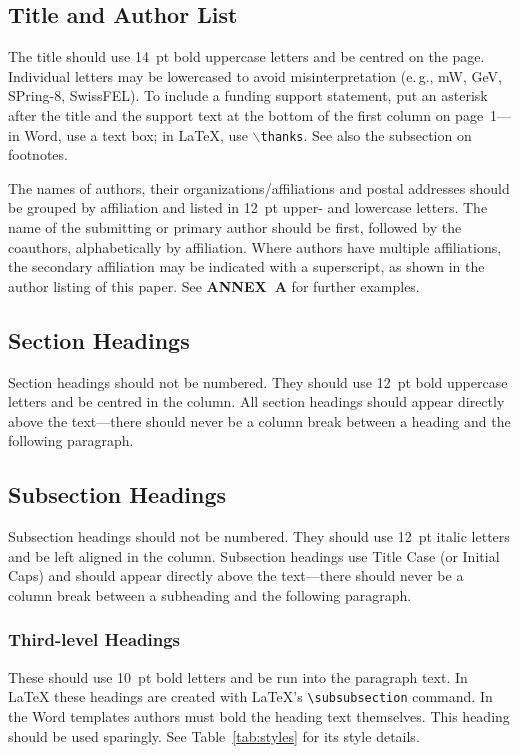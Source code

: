 \documentclass[a4paper,
               keeplastbox,   %
               ]{jacow}
\begin{document}
\subsection{Title and Author List}

The title should use \SI{14}{pt} bold uppercase letters and be centred on the page.
Individual letters may be lowercased to avoid misinterpretation (e.\,g., mW, GeV, 
SPring-8, SwissFEL).
To include a funding support statement, put an asterisk after the title and
the support text at the bottom of the first column on page~1---in Word,
use a text box; in \LaTeX, use $\backslash$\texttt{thanks}. See also the
subsection on footnotes.

The names of authors, their organizations/affiliations and
postal addresses should be grouped by affiliation and
listed in \SI{12}{pt} upper- and lowercase letters. The name of
the submitting or primary author should be first, followed
by the coauthors, alphabetically by affiliation. Where
authors have multiple affiliations, the secondary affiliation
may be indicated with a superscript, as shown in the
author listing of this paper. See \textbf{ANNEX~A} for further examples.

\subsection{Section Headings}

Section headings should not be numbered. They should
use  \SI{12}{pt}  bold  uppercase  letters  and  be  centred  in  the
column. All section headings should appear directly above
the text---there should never be a column break between a heading and the
following paragraph.

\subsection{Subsection Headings}

Subsection  headings  should  not  be  numbered.
They should use \SI{12}{pt} italic letters and be left aligned in the column.
Subsection headings use Title Case (or Initial Caps)
and should appear directly above the text---there should never be a column break
between a subheading and the following paragraph.

\subsubsection{Third-level Headings} These should use \SI{10}{pt} bold
letters and be run into the paragraph text. In \LaTeX{} these headings are
created with \LaTeX's \verb|\subsubsection| command.
In the Word templates authors must bold the heading text themselves.
This heading should be used sparingly. See Table~\ref{tab:styles}
for its style details.
\end{document}
